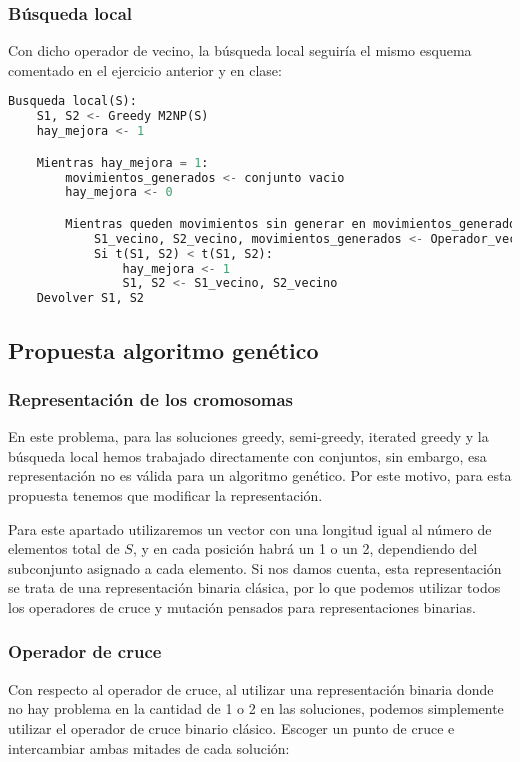 \subsubsection{Búsqueda local}

Con dicho operador de vecino, la búsqueda local seguiría el mismo esquema comentado en el ejercicio anterior y en clase:

\begin{lstlisting}[language=python]
Busqueda local(S):
	S1, S2 <- Greedy M2NP(S)
	hay_mejora <- 1

	Mientras hay_mejora = 1:
		movimientos_generados <- conjunto vacio
		hay_mejora <- 0

		Mientras queden movimientos sin generar en movimientos_generados y hay_mejora = 0:
			S1_vecino, S2_vecino, movimientos_generados <- Operador_vecino(S1, S2, movimientos_generados)
			Si t(S1, S2) < t(S1, S2):
				hay_mejora <- 1
				S1, S2 <- S1_vecino, S2_vecino
	Devolver S1, S2
\end{lstlisting}

\subsection{Propuesta algoritmo genético}

\subsubsection{Representación de los cromosomas}

En este problema, para las soluciones greedy, semi-greedy, iterated greedy y la búsqueda local hemos trabajado directamente con conjuntos, sin embargo, esa representación no es válida para un algoritmo genético. Por este motivo, para esta propuesta tenemos que modificar la representación.

Para este apartado utilizaremos un vector con una longitud igual al número de elementos total de $S$, y en cada posición habrá un 1 o un 2, dependiendo del subconjunto asignado a cada elemento. Si nos damos cuenta, esta representación se trata de una representación binaria clásica, por lo que podemos utilizar todos los operadores de cruce y mutación pensados para representaciones binarias.

\subsubsection{Operador de cruce}

Con respecto al operador de cruce, al utilizar una representación binaria donde no hay problema en la cantidad de 1 o 2 en las soluciones, podemos simplemente utilizar el operador de cruce binario clásico. Escoger un punto de cruce e intercambiar ambas mitades de cada solución:

